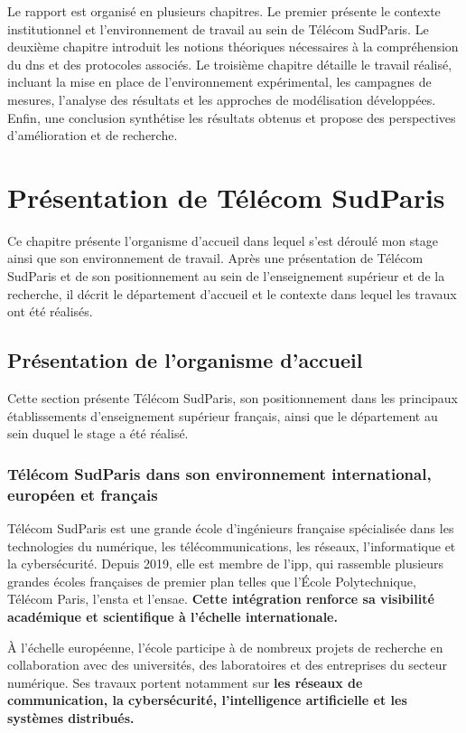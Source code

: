\documentclass[12pt, a4paper]{report}
\begin{document}
	Le rapport est organisé en plusieurs chapitres. Le premier présente le contexte institutionnel et l'environnement de travail au sein de Télécom SudParis. Le deuxième chapitre introduit les notions théoriques nécessaires à la compréhension du \gls{dns} et des protocoles associés. Le troisième chapitre détaille le travail réalisé, incluant la mise en place de l'environnement expérimental, les campagnes de mesures, l'analyse des résultats et les approches de modélisation développées. Enfin, une conclusion synthétise les résultats obtenus et propose des perspectives d'amélioration et de recherche.


	\chapter{Présentation de Télécom SudParis}

	Ce chapitre présente l'organisme d'accueil dans lequel s'est déroulé mon stage ainsi que son environnement de travail. Après une présentation de Télécom SudParis et de son positionnement au sein de l'enseignement supérieur et de la recherche, il décrit le département d'accueil et le contexte dans lequel les travaux ont été réalisés.

	\section{Présentation de l'organisme d'accueil}

	Cette section présente Télécom SudParis, son positionnement dans les principaux établissements d'enseignement supérieur français, ainsi que le département au sein duquel le stage a été réalisé.

	\subsection{Télécom SudParis dans son environnement international, européen et français}

	Télécom SudParis est une grande école d'ingénieurs française spécialisée dans les technologies du numérique, les télécommunications, les réseaux, l'informatique et la cybersécurité. Depuis 2019, elle est membre de l'\gls{ipp}, qui rassemble plusieurs grandes écoles françaises de premier plan telles que l'École Polytechnique, Télécom Paris, l'\gls{ensta} et l'\gls{ensae}. \textbf{Cette intégration renforce sa visibilité académique et scientifique à l'échelle internationale.}

	À l'échelle européenne, l'école participe à de nombreux projets de recherche en collaboration avec des universités, des laboratoires et des entreprises du secteur numérique. Ses travaux portent notamment sur \textbf{les réseaux de communication, la cybersécurité, l'intelligence artificielle et les systèmes distribués.}
\end{document}
